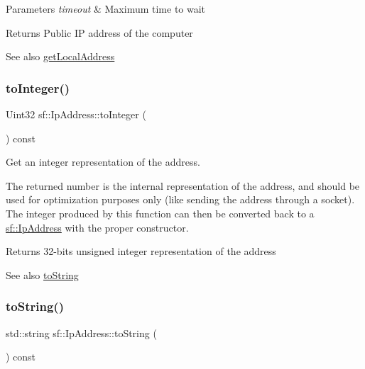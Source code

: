 \begin{DoxyParams}{Parameters}
{\em timeout} & Maximum time to wait\\
\hline
\end{DoxyParams}
\begin{DoxyReturn}{Returns}
Public IP address of the computer
\end{DoxyReturn}
\begin{DoxySeeAlso}{See also}
\hyperlink{classsf_1_1_ip_address_a4c31622ad87edca48adbb8e8ed00ee4a}{get\+Local\+Address} 
\end{DoxySeeAlso}
\mbox{\label{classsf_1_1_ip_address_ae7911c5ea9562f9602c3e29cd54b15e9}} 
\subsubsection{\texorpdfstring{to\+Integer()}{toInteger()}}
{\footnotesize\ttfamily Uint32 sf\+::\+Ip\+Address\+::to\+Integer (\begin{DoxyParamCaption}{ }\end{DoxyParamCaption}) const}



Get an integer representation of the address. 

The returned number is the internal representation of the address, and should be used for optimization purposes only (like sending the address through a socket). The integer produced by this function can then be converted back to a \hyperlink{classsf_1_1_ip_address}{sf\+::\+Ip\+Address} with the proper constructor.

\begin{DoxyReturn}{Returns}
32-\/bits unsigned integer representation of the address
\end{DoxyReturn}
\begin{DoxySeeAlso}{See also}
\hyperlink{classsf_1_1_ip_address_a88507954142d7fc2176cce7f36422340}{to\+String} 
\end{DoxySeeAlso}
\mbox{\label{classsf_1_1_ip_address_a88507954142d7fc2176cce7f36422340}} 
\subsubsection{\texorpdfstring{to\+String()}{toString()}}
{\footnotesize\ttfamily std\+::string sf\+::\+Ip\+Address\+::to\+String (\begin{DoxyParamCaption}{ }\end{DoxyParamCaption}) const}



